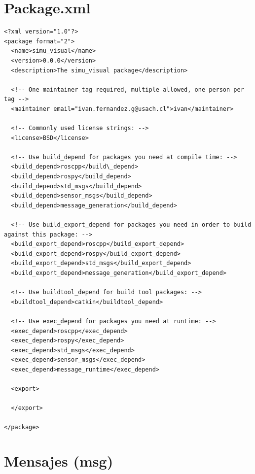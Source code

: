     \section{Package.xml}
        \lstset{language=XML}
        \begin{lstlisting}
<?xml version="1.0"?>
<package format="2">
  <name>simu_visual</name>
  <version>0.0.0</version>
  <description>The simu_visual package</description>

  <!-- One maintainer tag required, multiple allowed, one person per tag -->
  <maintainer email="ivan.fernandez.g@usach.cl">ivan</maintainer>

  <!-- Commonly used license strings: -->
  <license>BSD</license>

  <!-- Use build_depend for packages you need at compile time: -->
  <build_depend>roscpp</build\_depend>
  <build_depend>rospy</build_depend>
  <build_depend>std_msgs</build_depend>
  <build_depend>sensor_msgs</build_depend>
  <build_depend>message_generation</build_depend>

  <!-- Use build_export_depend for packages you need in order to build against this package: -->
  <build_export_depend>roscpp</build_export_depend>
  <build_export_depend>rospy</build_export_depend>
  <build_export_depend>std_msgs</build_export_depend>
  <build_export_depend>message_generation</build_export_depend>

  <!-- Use buildtool_depend for build tool packages: -->
  <buildtool_depend>catkin</buildtool_depend>

  <!-- Use exec_depend for packages you need at runtime: -->
  <exec_depend>roscpp</exec_depend>
  <exec_depend>rospy</exec_depend>
  <exec_depend>std_msgs</exec_depend>
  <exec_depend>sensor_msgs</exec_depend>
  <exec_depend>message_runtime</exec_depend>
  
  <export>

  </export>

</package>

    \end{lstlisting}

    \newpage

    \section{Mensajes (msg)}
